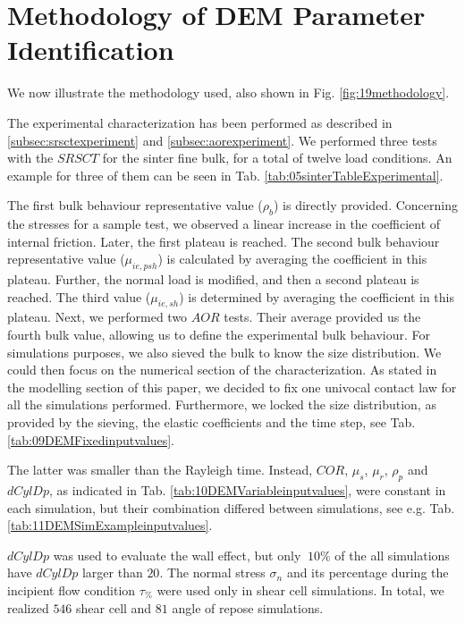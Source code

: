 \section{Methodology of DEM Parameter Identification}
\label{sec:methodology}

We now illustrate the methodology used, also shown in Fig.
\ref{fig:19methodology}.

The experimental characterization has been performed as described in
\ref{subsec:srsctexperiment} and \ref{subsec:aorexperiment}. We performed
three tests with the $SRSCT$ for the sinter fine bulk, for a total of twelve
load conditions. An example for three of them can be seen in Tab. \ref{tab:05sinterTableExperimental}.

The first bulk behaviour representative value ($\rho_b$) is directly provided. 
Concerning the stresses for a sample test, we observed a linear increase in the coefficient of internal friction. 
Later, the first plateau is reached. 
The second bulk behaviour representative value ($\mu_{ie,psh}$) is calculated by averaging the coefficient in this plateau. 
Further, the normal load is modified, and then a second plateau is reached. The third value ($\mu_{ie,sh}$) is 
determined by averaging the coefficient in this plateau. 
Next, we performed two $AOR$ tests. 
Their average provided us the fourth bulk value, allowing us to define the experimental bulk behaviour. 
For simulations purposes, we also sieved the bulk to know the size distribution.
We could then focus on the numerical section of the characterization. 
As stated in the modelling section of this paper, we decided to fix one univocal contact law for all the simulations performed. 
Furthermore, we locked the size distribution, as provided by the sieving, the
elastic coefficients and the time step, see Tab.
\ref{tab:09DEMFixedinputvalues}.


The latter was smaller than the Rayleigh time. Instead, $COR$, $\mu_s$, $\mu_r$,
$\rho_p$ and $dCylDp$, as indicated in Tab. \ref{tab:10DEMVariableinputvalues},
were constant in each simulation, but their combination differed between
simulations, see e.g. Tab. \ref{tab:11DEMSimExampleinputvalues}.

$dCylDp$ was used to evaluate the wall effect, but only $~10\%$ of the all
simulations have $dCylDp$ larger than $20$. The normal stress $\sigma_n$ and its
percentage during the incipient flow condition $\tau_{\%}$ were used only in shear cell simulations. 
In total, we realized $546$ shear cell and $81$ angle of repose simulations.
